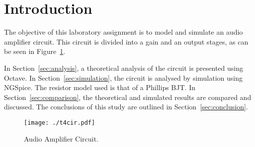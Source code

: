 \section{Introduction}
\label{sec:introduction}


The objective of this laboratory assignment is to model and simulate an audio amplifier circuit. This circuit is divided into a gain and an output stages, as can be seen in Figure~\ref{fig:cir}.

In Section~\ref{sec:analysis}, a theoretical analysis of the circuit is presented using Octave. In Section~\ref{sec:simulation}, the circuit is analysed by simulation using NGSpice. The resistor model used is that of a Phillips BJT. In Section~\ref{sec:comparison}, the theoretical and simulated results are compared and discussed. The conclusions of this study are outlined in
Section~\ref{sec:conclusion}.

\begin{figure}[h] \centering
\texttt{[image: ./t4cir.pdf]}
\caption{Audio Amplifier Circuit.}
\label{fig:cir}
\end{figure}

